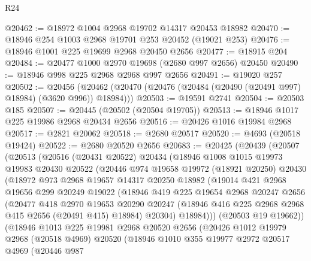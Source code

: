 \begin{lexlean}{R24}
\begin{coremodule}
@20462 := @18972 @1004 @2968 @19702 @14317 @20453 @18982
@20470 := @18946 @254 @1003 @2968 @19701 @253 @20452 (@19021 @253)
@20476 := @18946 @1001 @225 @19699 @2968 @20450 @2656
@20477 := @18915 @204
@20484 := @20477 @1000 @2970 @19698 (@2680 @997 @2656) @20450
@20490 := @18946 @998 @225 @2968 @2968 @997 @2656
@20491 := @19020 @257
@20502 := @20456
    (@20462 (@20470 (@20476 (@20484 (@20490 (@20491 @997) @18984) (@3620 @996)) @18984)))
@20503 := @19591 @2741
@20504 := @20503 @185
@20507 := @20445 (@20502 (@20504 @19705))
@20513 := @18946 @1017 @225 @19986 @2968 @20434 @2656
@20516 := @20426 @1016 @19984 @2968
@20517 := @2821 @20062
@20518 := @2680 @20517
@20520 := @4693 (@20518 @19424)
@20522 := @2680 @20520 @2656
@20683 := @20425
    (@20439
      (@20507
        (@20513
          (@20516
            (@20431 @20522)
            @20434
            (@18946
              @1008
              @1015
              @19973
              @19983
              @20430
              @20522
              (@20446
                @974
                @19658
                @19972
                (@18921 @20250)
                @20430
                (@18972
                  @973
                  @2968
                  @19657
                  @14317
                  @20250
                  @18982
                  (@19014
                    @421
                    @2968
                    @19656
                    @299
                    @20249
                    @19022
                    (@18946
                      @419
                      @225
                      @19654
                      @2968
                      @20247
                      @2656
                      (@20477
                        @418
                        @2970
                        @19653
                        @20290
                        @20247
                        (@18946 @416 @225 @2968 @2968 @415 @2656 (@20491 @415) @18984)
                        @20304)
                      @18984)))
                (@20503 @19 @19662))
              (@18946
                @1013
                @225
                @19981
                @2968
                @20520
                @2656
                (@20426
                  @1012
                  @19979
                  @2968
                  (@20518 @4969)
                  @20520
                  (@18946
                    @1010
                    @355
                    @19977
                    @2972
                    @20517
                    @4969
                    (@20446
                      @987

\end{coremodule}
\end{lexlean}

